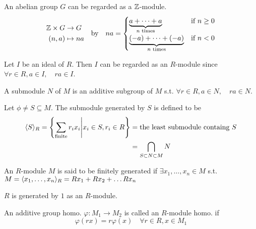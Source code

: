 \begin{example}
  An abelian group $G$ can be regarded as a $\mathbb{Z}$-module.
  \[
    \begin{aligned}
      \mathbb{Z} \times G &\to G\\
      (n, a) &\mapsto na
    \end{aligned}
    \quad \text{by} \quad
    na = \begin{cases}
      \underbrace{a + \dots + a}_{n\text{~times}} & \text{if~} n \ge 0 \\
      \underbrace{(-a) + \dots + (-a)}_{n\text{~times}} & \text{if~} n < 0
    \end{cases}
  \]
\end{example}

\begin{example}
  Let $I$ be an ideal of $R$. Then $I$ can be regarded as an $R$-module
  since $\forall r \in R, a \in I, \quad ra \in I$.
\end{example}

\begin{definition}
  A submodule $N$ of $M$ is an additive subgroup of $M$ s.t.
  $\forall r \in R, a \in N, \quad ra \in N$.
\end{definition}

\begin{prop}
  Let $\phi \ne S \subseteq M$. The submodule generated by $S$ is defined to be
  \begin{align*}
    \langle S\rangle_R = \left\{
      \sum_{\text{finite}} r_i x_i \middle| x_i \in S, r_i \in R
    \right\} &= \text{the least submodule containg $S$} \\
             &= \bigcap_{S \subset N \subset M} N
  \end{align*}
\end{prop}

\begin{definition}
  An $R$-module $M$ is said to be finitely generated if
  $\exists x_1, \dots, x_n \in M$ s.t.
  $M = \langle x_1, \dots, x_n\rangle_R = Rx_1 + Rx_2 + \dots Rx_n$
\end{definition}

\begin{example}
  $R$ is generated by $1$ as an $R$-module.
\end{example}

\begin{definition}
  An additive group homo. $\varphi: M_1 \to M_2$ is called an $R$-module
  homo. if
  \[ \varphi(rx) = r\varphi(x) \quad \forall r \in R, x \in M_1 \]
\end{definition}


